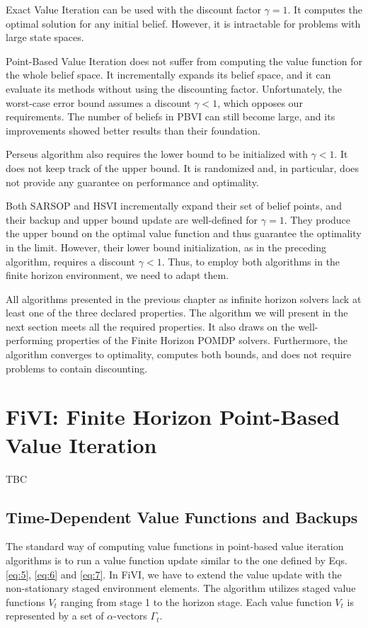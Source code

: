 Exact Value Iteration can be used with the discount factor $\gamma = 1$. It computes the optimal solution for any initial belief. However, it is intractable for problems with large state spaces.

Point-Based Value Iteration does not suffer from computing the value function for the whole belief space. It incrementally expands its belief space, and it can evaluate its methods without using the discounting factor. Unfortunately, the worst-case error bound assumes a discount $\gamma < 1$, which opposes our requirements. The number of beliefs in PBVI  can still become large, and its improvements showed better results than their foundation.

Perseus algorithm also requires the lower bound to be initialized with $\gamma < 1$. It does not keep track of the upper bound. It is randomized and, in particular, does not provide any guarantee on performance and optimality.

Both SARSOP and HSVI incrementally expand their set of belief points, and their backup and upper bound update are well-defined for $\gamma = 1$. They produce the upper bound on the optimal value function and thus guarantee the optimality in the limit. However, their lower bound initialization, as in the preceding algorithm, requires a discount $\gamma < 1$. Thus, to employ both algorithms in the finite horizon environment, we need to adapt them.

All algorithms presented in the previous chapter as infinite horizon solvers lack at least one of the three declared properties. The algorithm we will present in the next section meets all the required properties. It also draws on the well-performing properties of the Finite Horizon POMDP solvers. Furthermore, the algorithm converges to optimality, computes both bounds, and does not require problems to contain discounting.

\section{FiVI: Finite Horizon Point-Based Value Iteration}


TBC

\subsection{Time-Dependent Value Functions and Backups}
The standard way of computing value functions in point-based value iteration algorithms is to run a value function update similar to the one defined by Eqs. \ref{eq:5}, \ref{eq:6} and \ref{eq:7}. In FiVI, we have to extend the value update with the non-stationary staged environment elements. The algorithm utilizes staged value functions $V_t$ ranging from stage 1 to the horizon stage. Each value function $V_t$ is represented by a set of $\alpha$-vectors $\Gamma_t$.

